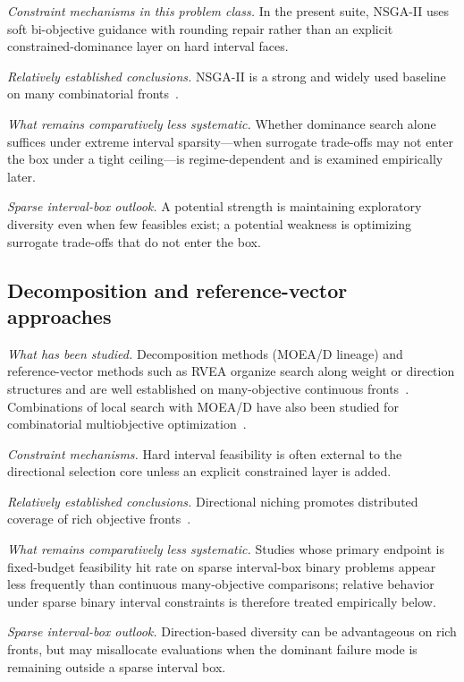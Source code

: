 \documentclass[lettersize,journal]{IEEEtran}
\begin{document}
\emph{Constraint mechanisms in this problem class.}
In the present suite, NSGA-II uses soft bi-objective guidance with rounding repair rather than an explicit constrained-dominance layer on hard interval faces.

\emph{Relatively established conclusions.}
NSGA-II is a strong and widely used baseline on many combinatorial fronts~\cite{deb2002,li2024empiricalcompari3898}.

\emph{What remains comparatively less systematic.}
Whether dominance search alone suffices under extreme interval sparsity---when surrogate trade-offs may not enter the box under a tight ceiling---is regime-dependent and is examined empirically later.

\emph{Sparse interval-box outlook.}
A potential strength is maintaining exploratory diversity even when few feasibles exist; a potential weakness is optimizing surrogate trade-offs that do not enter the box.

\subsection{Decomposition and reference-vector approaches}
\emph{What has been studied.}
Decomposition methods (MOEA/D lineage) and reference-vector methods such as RVEA organize search along weight or direction structures and are well established on many-objective continuous fronts~\cite{zhang2007,cheng2016}.
Combinations of local search with MOEA/D have also been studied for combinatorial multiobjective optimization~\cite{derbel2025asimplecombinatia389}.

\emph{Constraint mechanisms.}
Hard interval feasibility is often external to the directional selection core unless an explicit constrained layer is added.

\emph{Relatively established conclusions.}
Directional niching promotes distributed coverage of rich objective fronts~\cite{zhang2007,cheng2016}.

\emph{What remains comparatively less systematic.}
Studies whose primary endpoint is fixed-budget feasibility hit rate on sparse interval-box binary problems appear less frequently than continuous many-objective comparisons; relative behavior under sparse binary interval constraints is therefore treated empirically below.

\emph{Sparse interval-box outlook.}
Direction-based diversity can be advantageous on rich fronts, but may misallocate evaluations when the dominant failure mode is remaining outside a sparse interval box.
\end{document}
